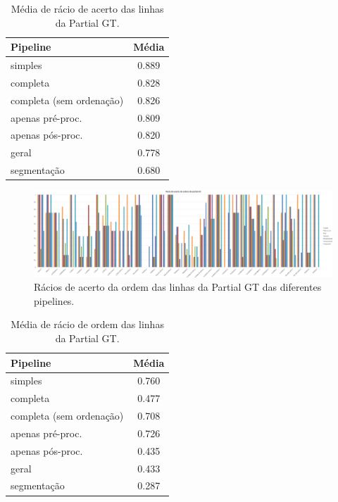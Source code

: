 \begin{table}[H]
	\centering
	\small
	\begin{tabular}{|l|c|}
		\hline
		\textbf{Pipeline} & \textbf{Média} \\ \hline
		simples & 0.889 				   \\ \hline
		completa & 0.828 				   \\ \hline
		completa (sem ordenação) & 0.826   \\ \hline
		apenas pré-proc. & 0.809 		   \\ \hline
		apenas pós-proc. & 0.820 		   \\ \hline
		geral & 0.778 					   \\ \hline
		segmentação & 0.680 			   \\ \hline
	\end{tabular}
	\caption{Média de rácio de acerto das linhas da Partial GT.}
\end{table}



\begin{figure}[H]
	\centering
	\hspace*{-2cm}
	\includegraphics[width=1.25\textwidth]{images/resultados/graph_pgt_correct_order_ratio.png}
	\caption{Rácios de acerto da ordem das linhas da Partial GT das diferentes pipelines.}
	\label{fig:graph_pgt_correct_order_ratio}
\end{figure}


\begin{table}[H]
	\centering
	\small
	\begin{tabular}{|l|c|}
		\hline
		\textbf{Pipeline} & \textbf{Média} \\ \hline
		simples & 0.760 				   \\ \hline
		completa & 0.477 				   \\ \hline
		completa (sem ordenação) & 0.708   \\ \hline
		apenas pré-proc. & 0.726 		   \\ \hline
		apenas pós-proc. & 0.435 		   \\ \hline
		geral & 0.433 					   \\ \hline
		segmentação & 0.287 			   \\ \hline
	\end{tabular}
	\caption{Média de rácio de ordem das linhas da Partial GT.}
\end{table}



